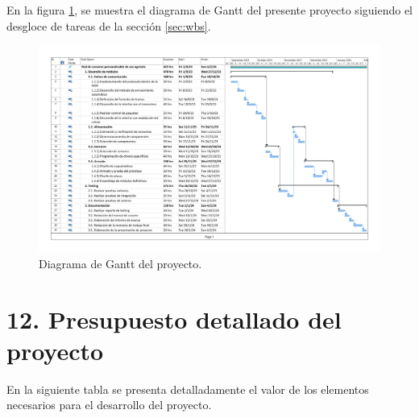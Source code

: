 \documentclass[
11pt, %
codirector, %
]{charter}
\begin{document}
En la figura \ref{fig:diagGantt}, se muestra el diagrama de Gantt del presente proyecto siguiendo el desgloce de tareas de la sección \ref{sec:wbs}.

\begin{landscape}
\begin{figure}[htpb]
\centering 
\includegraphics[height=.90\textheight]{./Figuras/gantt.pdf}
\caption{Diagrama de Gantt del proyecto.}
\label{fig:diagGantt}
\end{figure}

\end{landscape}


\section{12. Presupuesto detallado del proyecto}
\label{sec:presupuesto}

En la siguiente tabla se presenta detalladamente el valor de los elementos necesarios para el desarrollo del proyecto.
\end{document}
